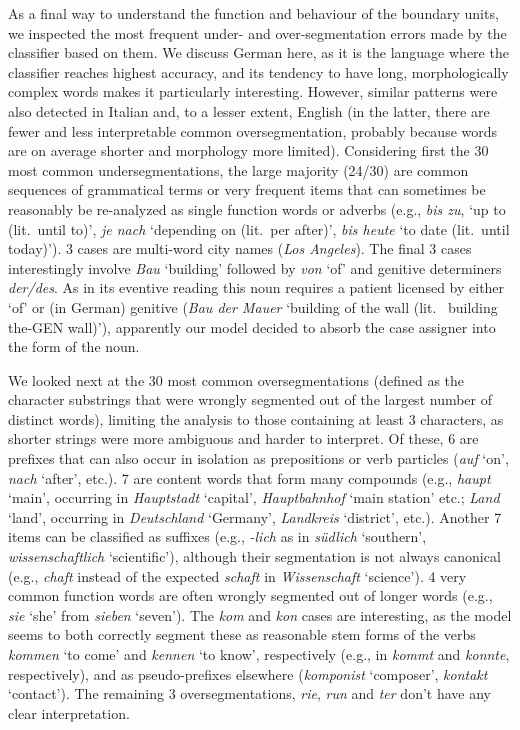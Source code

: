 As a final way to understand the function and behaviour of the
boundary units, we inspected the most frequent under- and
over-segmentation errors made by the classifier based on them. We
discuss German here, as it is the language where the classifier
reaches highest accuracy, and its tendency to have long,
morphologically complex words makes it particularly
interesting. However, similar patterns were also detected in Italian
and, to a lesser extent, English (in the latter, there are fewer and
less interpretable common oversegmentation, probably because words are
on average shorter and morphology more limited). Considering first the
30 most common undersegmentations, the
large majority (24/30) are common sequences of grammatical terms or
very frequent items that can sometimes be reasonably be re-analyzed as
single function words or adverbs (e.g., \emph{bis zu}, `up to
(lit.~until to)', \emph{je nach} `depending on (lit.~per after)',
\emph{bis heute} `to date (lit.~until today)'). 3 cases are multi-word
city names (\emph{Los Angeles}). The final 3 cases interestingly
involve \emph{Bau} `building' followed by \emph{von} `of' and genitive
determiners \emph{der/des}. As in its eventive reading this noun
requires a patient licensed by either `of' or (in German) genitive
(\emph{Bau der Mauer} `building of the wall (lit.~ building the-GEN
wall)'), apparently our model decided to absorb the case assigner into
the form of the noun.

We looked next at the 30 most common oversegmentations  (defined as the character substrings that were
wrongly segmented out of the largest number of distinct words),
limiting the analysis to those containing at least 3 characters, as
shorter strings were more ambiguous and harder to interpret. Of these,
6 are prefixes that can also occur in isolation as prepositions or
verb particles (\emph{auf} `on', \emph{nach} `after', etc.). 7 are
content words that form many compounds (e.g., \emph{haupt} `main',
occurring in \emph{Hauptstadt} `capital', \emph{Hauptbahnhof} `main
station' etc.; \emph{Land} `land', occurring in \emph{Deutschland}
`Germany', \emph{Landkreis} `district', etc.). Another 7 items can be
classified as suffixes (e.g., \emph{-lich} as in \emph{s\"udlich}
`southern', \emph{wissenschaftlich} `scientific'), although their
segmentation is not always canonical (e.g., \emph{chaft} instead of
the expected \emph{schaft} in \emph{Wissenschaft} `science'). 4 very
common function words are often wrongly segmented out of longer words
(e.g., \emph{sie} `she' from \emph{sieben} `seven'). The \emph{kom}
and \emph{kon} cases are interesting, as the model seems to both
correctly segment these as reasonable stem forms of the verbs
\emph{kommen} `to come' and \emph{kennen} `to know', respectively
(e.g., in \emph{kommt} and \emph{konnte}, respectively), and as
pseudo-prefixes elsewhere (\emph{komponist} `composer', \emph{kontakt}
`contact'). The remaining 3 oversegmentations, \emph{rie}, \emph{run}
and \emph{ter} don't have any clear interpretation.

